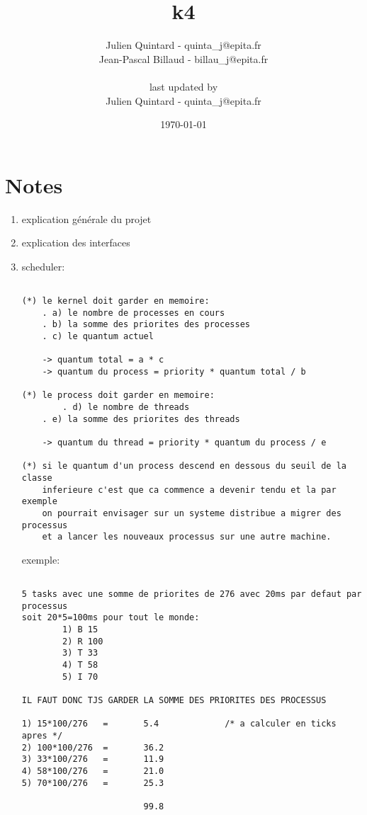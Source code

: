 \documentclass[10pt,a4wide]{article}
\title{k4}
\author{Julien Quintard - \small{quinta\_j@epita.fr} \\
        Jean-Pascal Billaud - \small{billau\_j@epita.fr} \\ \\
	\small{last updated by} \\
	Julien Quintard - \small{quinta\_j@epita.fr}}
\date{\today}
\begin{document}
\maketitle

\section{Notes}

\begin{enumerate}

\item explication g\'en\'erale du projet

\item explication des interfaces

\item scheduler:

\begin{verbatim}

(*) le kernel doit garder en memoire:
	. a) le nombre de processes en cours
	. b) la somme des priorites des processes
	. c) le quantum actuel

	-> quantum total = a * c
	-> quantum du process = priority * quantum total / b

(*) le process doit garder en memoire:
        . d) le nombre de threads
	. e) la somme des priorites des threads

	-> quantum du thread = priority * quantum du process / e

(*) si le quantum d'un process descend en dessous du seuil de la classe
    inferieure c'est que ca commence a devenir tendu et la par exemple
    on pourrait envisager sur un systeme distribue a migrer des processus
    et a lancer les nouveaux processus sur une autre machine.

\end{verbatim}

exemple:

\begin{verbatim}

5 tasks avec une somme de priorites de 276 avec 20ms par defaut par processus
soit 20*5=100ms pour tout le monde:
        1) B 15
        2) R 100
        3) T 33
        4) T 58
        5) I 70

IL FAUT DONC TJS GARDER LA SOMME DES PRIORITES DES PROCESSUS

1) 15*100/276   =       5.4             /* a calculer en ticks apres */
2) 100*100/276  =       36.2
3) 33*100/276   =       11.9
4) 58*100/276   =       21.0
5) 70*100/276   =       25.3

                        99.8

\end{verbatim}

\end{enumerate}
\end{document}
